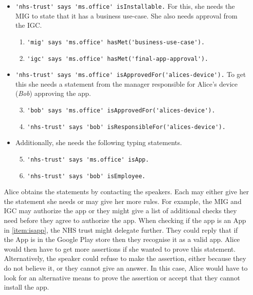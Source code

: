 \documentclass[thesis.tex]{subfiles}
\begin{document}
\begin{itemize}
  \item \lstinline!'nhs-trust' says 'ms.office' isInstallable.!
    For this, she needs the \ac{MIG} to state that it has a business use-case.
    She also needs approval from the \ac{IGC}.
    \begin{enumerate}\setcounter{enumi}{0}
      \item \lstinline!'mig' says 'ms.office' hasMet('business-use-case').!
      \item \lstinline!'igc' says 'ms.office' hasMet('final-app-approval').!
    \end{enumerate}
  \item \lstinline!'nhs-trust' says 'ms.office' isApprovedFor('alices-device').!
    To get this she needs a statement from the manager responsible for Alice's device (\emph{Bob}) approving the app.
    \begin{enumerate}\setcounter{enumi}{2}
      \item \lstinline!'bob' says 'ms.office' isApprovedFor('alices-device').!
      \item \lstinline!'nhs-trust' says 'bob' isResponsibleFor('alices-device').!
    \end{enumerate}
  \item Additionally, she needs the following typing statements.
    \begin{enumerate}\setcounter{enumi}{4}
      \item \lstinline!'nhs-trust' says 'ms.office' isApp.! \label{item:isapp}
      \item \lstinline!'nhs-trust' says 'bob' isEmployee.!
    \end{enumerate}
\end{itemize}

Alice obtains the statements by contacting the speakers.
Each may either give her the statement she needs or may give her more rules.
For example, the \ac{MIG} and \ac{IGC} may authorize the app or they might give a list of additional checks they need before they agree to authorize the app.
When checking if the app is an App in \autoref{item:isapp}, the NHS trust might delegate further.
They could reply that if the App is in the Google Play store then they recognise it as a valid app.
Alice would then have to get more assertions if she wanted to prove this statement.
Alternatively, the speaker could refuse to make the assertion, either because they do not believe it, or they cannot give an answer.
In this case, Alice would have to look for an alternative means to prove the assertion or accept that they cannot install the app.
\end{document}
